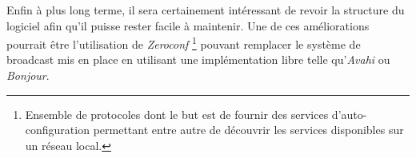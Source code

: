 Enfin à plus long terme, il sera certainement intéressant de revoir la
structure du logiciel afin qu'il puisse rester facile à maintenir.
Une de ces améliorations pourrait être l'utilisation de \emph{Zeroconf}
\footnote{Ensemble de protocoles dont le but est de fournir des services
d'auto-configuration permettant entre autre de découvrir les services
disponibles sur un réseau local.} pouvant remplacer le système de
broadcast mis en place en utilisant une implémentation libre telle
qu'\emph{Avahi}\cite{avahi} ou \emph{Bonjour}\cite{bonjour}.